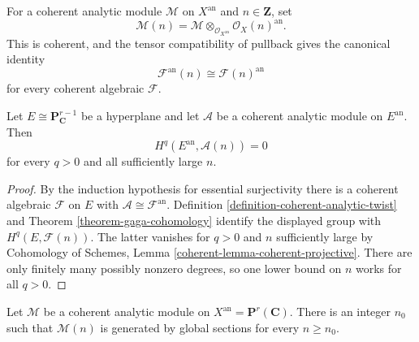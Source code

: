 \begin{definition}
\label{definition-coherent-analytic-twist}
For a coherent analytic module $\mathcal M$ on $X^{\mathrm{an}}$ and
$n\in\mathbf Z$, set
$$
\mathcal M(n)=
\mathcal M\otimes_{\mathcal O_{X^{\mathrm{an}}}}
\mathcal O_X(n)^{\mathrm{an}}.
$$
This is coherent, and the tensor compatibility of pullback gives the
canonical identity
$$
\mathcal F^{\mathrm{an}}(n)\cong\mathcal F(n)^{\mathrm{an}}
$$
for every coherent algebraic $\mathcal F$.
\end{definition}

\begin{lemma}
\label{lemma-hyperplane-analytic-serre-vanishing}
Let $E\cong\mathbf P^{r-1}_{\mathbf C}$ be a hyperplane and let $\mathcal A$
be a coherent analytic module on $E^{\mathrm{an}}$. Then
$$
H^q(E^{\mathrm{an}},\mathcal A(n))=0
$$
for every $q>0$ and all sufficiently large $n$.
\end{lemma}

\begin{proof}
By the induction hypothesis for essential surjectivity there is a coherent
algebraic $\mathcal F$ on $E$ with
$\mathcal A\cong\mathcal F^{\mathrm{an}}$. Definition
\ref{definition-coherent-analytic-twist} and Theorem
\ref{theorem-gaga-cohomology} identify the displayed group with
$H^q(E,\mathcal F(n))$. The latter vanishes for $q>0$ and $n$ sufficiently
large by Cohomology of Schemes, Lemma
\ref{coherent-lemma-coherent-projective}. There are only finitely many
possibly nonzero degrees, so one lower bound on $n$ works for all $q>0$.
\end{proof}

\begin{lemma}
\label{lemma-projective-analytic-global-generation}
Let $\mathcal M$ be a coherent analytic module on
$X^{\mathrm{an}}=\mathbf P^r(\mathbf C)$. There is an integer $n_0$ such
that $\mathcal M(n)$ is generated by global sections for every $n\geq n_0$.
\end{lemma}

